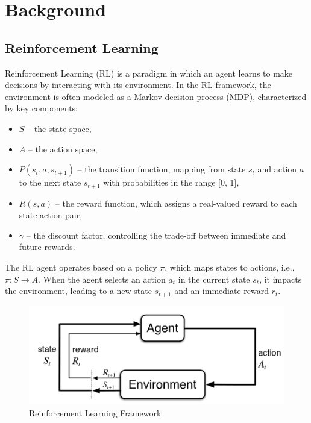 \chapter{Background}
\section{Reinforcement Learning}

Reinforcement Learning (RL) is a paradigm in which an agent learns to make decisions by interacting with its environment. In the RL framework, the environment is often modeled as a Markov decision process (MDP), characterized by key components:

\begin{itemize}
  \item $S$ – the state space,
  \item $A$ – the action space,
  \item $P(s_t, a, s_{t+1})$ – the transition function, mapping from state $s_t$ and action $a$ to the next state $s_{t+1}$ with probabilities in the range [0, 1],
  \item $R(s, a)$ – the reward function, which assigns a real-valued reward to each state-action pair,
  \item $\gamma$ – the discount factor, controlling the trade-off between immediate and future rewards.
\end{itemize}

The RL agent operates based on a policy $\pi$, which maps states to actions, i.e., $\pi: S \rightarrow A$. When the agent selects an action $a_t$ in the current state $s_t$, it impacts the environment, leading to a new state $s_{t+1}$ and an immediate reward $r_t$.

\begin{figure}[htpb]
    \centering
    \includegraphics[scale=0.4]{images/background/RL.png}
    \centering
    \caption{Reinforcement Learning Framework}
    \label{fig:rl-framework}
\end{figure}

